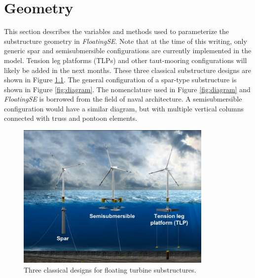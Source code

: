 \chapter{Geometry}
\label{sec:geom}
This section describes the variables and methods used to parameterize
the substructure geometry in \textit{FloatingSE}.  Note that at the time
of this writing, only generic spar and semisubmersible configurations
are currently implemented in the model.  Tension leg platforms (TLPs)
and other taut-mooring configurations will likely be added in the next
months.  These three classical substructure designs are shown in Figure
\ref{fig:archetype}.  The general configuration of a spar-type
substructure is shown in Figure \ref{fig:diagram}.  The nomenclature
used in Figure \ref{fig:diagram} and \textit{FloatingSE} is borrowed
from the field of naval architecture.  A semisubmersible configuration
would have a similar diagram, but with multiple vertical columns
connected with truss and pontoon elements.
%
\begin{figure}[htb]
  \begin{center}
    \includegraphics[width=3.75in]{figs/archetypes.pdf}
    \caption{Three classical designs for floating turbine substructures.}
    \label{fig:archetype}
  \end{center}
\end{figure}
%
